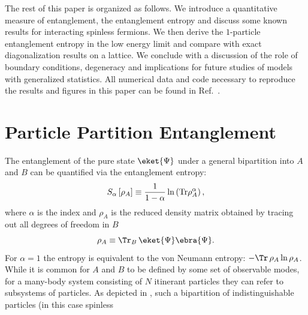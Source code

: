 The rest of this paper is organized as follows. We introduce a quantitative
measure of entanglement, the \ren entanglement entropy and discuss some known
results for interacting spinless fermions.  We then derive the $1$-particle
entanglement entropy in the low energy limit and compare with exact
diagonalization results on a lattice.  We conclude with a discussion of the role
of boundary conditions, degeneracy and implications for future studies of
models with generalized statistics. All numerical data and code necessary to reproduce
the results and figures in this paper can be found in Ref.~\cite{repo}.


\section{Particle Partition Entanglement}
The entanglement of the pure state $\eket{\Psi}$ under a general bipartition
into $A$ and $B$ can be quantified via the \ren entanglement entropy:
%
\begin{equation}
S_{\alpha}\left[ \rho_A \right] \equiv \frac{1}{1-\alpha} \ln \left({ {\rm Tr} 
\rho_A^{\alpha} }\right), 
\label{eq:renyi}
\end{equation}
%
where $\alpha$ is the \ren index and $\rho_A$ is the reduced density matrix
obtained by tracing out all degrees of freedom in $B$
%
\begin{equation}
    \rho_A \equiv {\Tr}_{B}\, \eket{\Psi}\ebra{\Psi}.
\end{equation}
%
For $\alpha = 1$ the \ren entropy is equivalent to the von Neumann
entropy: $-\Tr\, \rho_A \ln \rho_A$.   
%
%
While it is common for $A$ and $B$ to be defined by some set of observable modes, for a
many-body system consisting of $N$ itinerant particles they can refer to 
subsystems of particles.  As depicted in ,
such a bipartition of indistinguishable particles (in this case spinless
